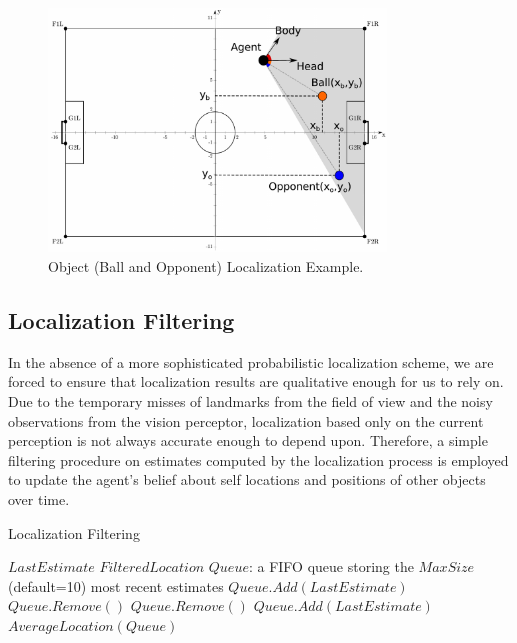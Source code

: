 \begin{figure}[t!]
\centering
  \includegraphics[width=0.8\textwidth]{Chapter3/figures/LocalizationResults.pdf}
  \caption{Object (Ball and Opponent) Localization Example.} 
  \label{fig:LocalizationResults}
\end{figure}
\hfill





\subsection{Localization Filtering}
In the absence of a more sophisticated probabilistic localization scheme, we are forced to ensure that localization results are qualitative enough for us to rely on. Due to the temporary misses of landmarks from the field of view and the noisy observations from the vision perceptor, localization based only on the current perception is not always accurate enough to depend upon. Therefore, a simple filtering procedure on estimates computed by the localization process is employed to update the agent's belief about self locations and positions of other objects over time. 


\begin{algorithm}[ht!]
\caption{Localization Filtering}
\label{LocalizationFiltering}
\begin{algorithmic}[1]
$LastEstimate$
$FilteredLocation$
\STATE $Queue$: a FIFO queue storing the $MaxSize$ (default=10) most recent estimates
\STATE 
{}
\STATE $Queue.Add(LastEstimate)$
\STATE $Queue.Remove()$
\ELSE 
{}
\STATE $Queue.Remove()$
\ENDIF
\STATE $Queue.Add(LastEstimate)$
\ENDIF
\RETURN $AverageLocation(Queue)$
\end{algorithmic}
\end{algorithm}

